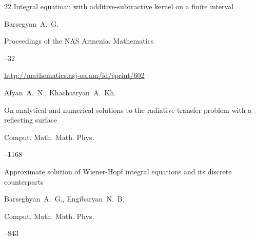 \begin{thebibliography}{22}
\paper Integral equatioan with additive-subtractive kernel on a finite interval

\by Barsegyan~A.~G.

\jour Proceedings of the NAS Armenia. Mathematics 




--32

 \elink \url{http://mathematics.asj-oa.am/id/eprint/602}




\by Afyan~A.~N., Khachatryan~A.~Kh.

\paper On analytical and numerical solutions to the radiative transfer problem with a reflecting surface



\jour Comput. Math. Math. Phys.




--1168




\paper Approximate solution of Wiener-Hopf integral equations and its discrete counterparts

\by Barseghyan~A.~G., Engibaryan~N.~B.



\jour Comput. Math. Math. Phys.




--843







\end{thebibliography}
